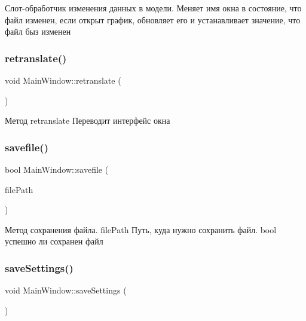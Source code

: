 Слот-\/обработчик изменения данных в модели. Меняет имя окна в состояние, что файл изменен, если открыт график, обновляет его и устанавливает значение, что файл быз изменен \mbox{\label{class_main_window_ae8662ae2ae5fc1d7921a9b18ec38ae9d}} 
\subsubsection{\texorpdfstring{retranslate()}{retranslate()}}
{\footnotesize\ttfamily void Main\+Window\+::retranslate (\begin{DoxyParamCaption}{ }\end{DoxyParamCaption})}

Метод retranslate Переводит интерфейс окна \mbox{\label{class_main_window_ac38843e08bed49b8822d9b979840b2bc}} 
\subsubsection{\texorpdfstring{savefile()}{savefile()}}
{\footnotesize\ttfamily bool Main\+Window\+::savefile (\begin{DoxyParamCaption}\item[{Q\+String}]{file\+Path }\end{DoxyParamCaption})\hspace{0.3cm}{\ttfamily [private]}}

Метод сохранения файла. file\+Path Путь, куда нужно сохранить файл. bool успешно ли сохранен файл \mbox{\label{class_main_window_abb30531afee763d0586ee6323fd332e2}} 
\subsubsection{\texorpdfstring{saveSettings()}{saveSettings()}}
{\footnotesize\ttfamily void Main\+Window\+::save\+Settings (\begin{DoxyParamCaption}{ }\end{DoxyParamCaption})\hspace{0.3cm}{\ttfamily [private]}}

